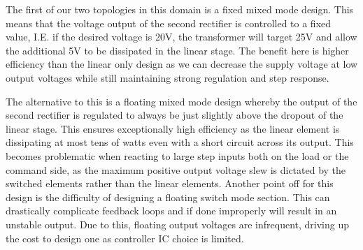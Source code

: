 \documentclass[12pt]{article}
\begin{document}
The first of our two topologies in this domain is a fixed mixed mode design. 
This means that the voltage output of the second rectifier is controlled to a 
fixed value, I.E. if the desired voltage is 20V, the transformer will target 25V 
and allow the additional 5V to be dissipated in the linear stage. The benefit 
here is higher efficiency than the linear only design as we can decrease the supply 
voltage at low output voltages while still maintaining strong regulation and step response.

The alternative to this is a floating mixed mode design whereby the output of the 
second rectifier is regulated to always be just slightly above the dropout of the 
linear stage. This ensures exceptionally high efficiency as the linear element is 
dissipating at most tens of watts even with a short circuit across its output. This  
becomes problematic when reacting to large step inputs both on the load or the command 
side, as the maximum positive output voltage slew is dictated by the switched elements 
rather than the linear elements. Another point off for this design is the difficulty of designing a floating switch mode section. This can drastically complicate feedback loops and if done improperly will result in an unstable output. Due to this, floating output voltages are infrequent, driving up 
the cost to design one as controller IC choice is limited.
\end{document}
